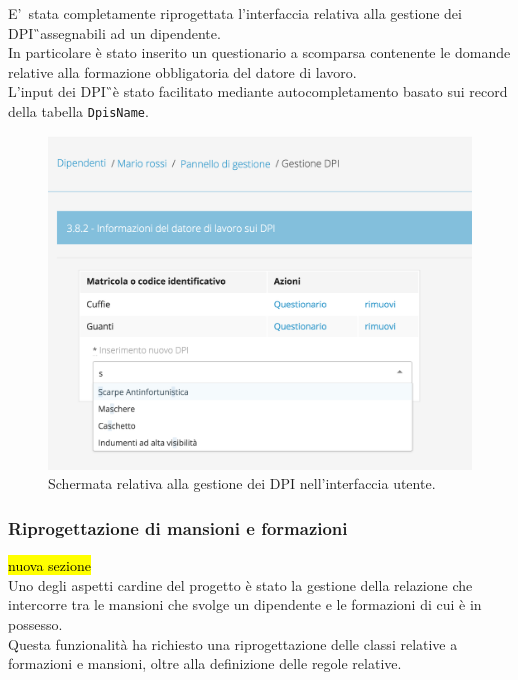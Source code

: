 E'\ stata completamente riprogettata l'interfaccia relativa alla gestione dei \gls{DPI}\G\ assegnabili ad un dipendente.\\
In particolare è stato inserito un questionario a scomparsa contenente le domande relative alla formazione obbligatoria del datore di lavoro. \\
L'input dei \gls{DPI}\G\ è stato facilitato mediante autocompletamento basato sui record della tabella \texttt{DpisName}.
\begin{figure}[H]
	\begin{center}
		\includegraphics[width=12cm]{Pics/ScreenDPI.png}
		\caption{Schermata relativa alla gestione dei DPI nell'interfaccia utente.}
		\label{fig:ScreenDPI}
	\end{center}
\end{figure}

\newpage
\subsubsection{Riprogettazione di mansioni e formazioni}
\hl{nuova sezione}\\
Uno degli aspetti cardine del progetto è stato la gestione della relazione che intercorre tra le mansioni che svolge un dipendente e le formazioni di cui è in possesso.\\
Questa funzionalità ha richiesto una riprogettazione delle classi relative a formazioni e mansioni, oltre alla definizione delle regole relative.\\


